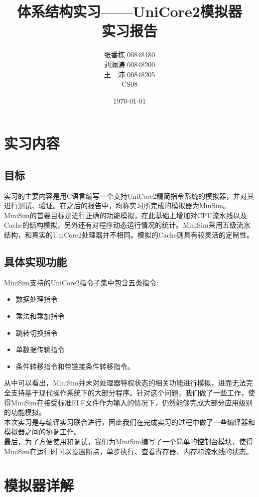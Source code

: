 \documentclass[12pt,a4paper,Flow]{report}
\begin{document}
  \title{\textbf{体系结构实习——UniCore2模拟器\\实习报告}}
  \author{张番栋 00848180\\刘澜涛 00848200\\王　沛 00848205\\CS08}
  \date{\today}
  \maketitle
  \tableofcontents
  \newpage
  \chapter{实习内容}
  \section{目标}
  实习的主要内容是用C语言编写一个支持UniCore2精简指令系统的模拟器，并对其进行测试、验证。在之后的报告中，均称实习所完成的模拟器为MinSim。MiniSim的首要目标是进行正确的功能模拟，在此基础上增加对CPU流水线以及Cache的结构模拟，另外还有对程序动态运行情况的统计。MiniSim采用五级流水结构，和真实的UniCore2处理器并不相同。模拟的Cache则具有较灵活的定制性。\\
  \section{具体实现功能}
  \indent MiniSim支持的UniCore2指令子集中包含五类指令:
  \begin{itemize}
  \item 数据处理指令
  \item 乘法和乘加指令
  \item 跳转切换指令
  \item 单数据传输指令
  \item 条件转移指令和带链接条件转移指令。
  \end{itemize}
  \indent 从中可以看出，MiniSim并未对处理器特权状态的相关功能进行模拟，进而无法完全支持基于现代操作系统下的大部分程序。针对这个问题，我们做了一些工作，使得MiniSim在接受标准ELF文件作为输入的情况下，仍然能够完成大部分应用级别的功能模拟。\\
  \indent 本次实习是与编译实习联合进行，因此我们在完成实习的过程中做了一些编译器和模拟器之间的协调工作。\\
  \indent 最后，为了方便使用和调试，我们为MiniSim编写了一个简单的控制台模块，使得MiniSim在运行时可以设置断点，单步执行、查看寄存器、内存和流水线的状态。
  \chapter{模拟器详解}
\end{document}
